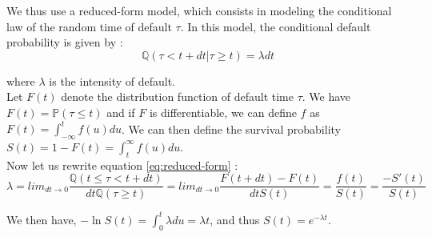 \documentclass[a4paper,11pt,english]{book}
\begin{document}
We thus use a reduced-form model, which consists in modeling the conditional law of the random time of default $\tau$. In this model, the conditional default probability is given by :
\begin{equation}
    \mathbb{Q}(\tau<t+dt|\tau\geq t)=\lambda dt
    \label{eq:reduced-form}
\end{equation}


where $\lambda$ is the intensity of default.\\

Let $F(t)$ denote the distribution function of default time $\tau$. We have $F(t)=\mathbb{P}(\tau\leq t)$ and if $F$ is differentiable, we can define $f$ as $F(t)=\int_{-\infty}^{t}f(u)du$.
We can then define the survival probability $S(t) = 1-F(t) = \int_{t}^{\infty}f(u)du$.\\

Now let us rewrite equation \ref{eq:reduced-form} :
$$\lambda = lim_{dt\to 0}\frac{\mathbb{Q}(t\leq \tau<t+dt)}{dt\mathbb{Q}(\tau\geq t)} = lim_{dt\to 0}\frac{F(t+dt)-F(t)}{dt S(t)}=\frac{f(t)}{S(t)}=\frac{-S'(t)}{S(t)}$$

We then have, $-\ln{S(t)}=\int_{0}^{t}\lambda du = \lambda t$, and thus $S(t)=e^{-\lambda t}$.
\end{document}

